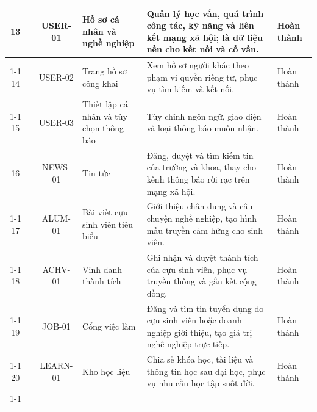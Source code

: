 \documentclass[12pt,a4paper,oneside]{report}
\begin{document}
\begin{landscape}
\begin{longtable}{|c|>{\raggedright\arraybackslash}p{3.1cm}|c|>{\raggedright\arraybackslash}p{4.6cm}|>{\raggedright\arraybackslash}p{8.4cm}|>{\raggedright\arraybackslash}p{2.4cm}|}
\hline
\cellcolor{oldrow}13 & \cellcolor{oldrow} & \cellcolor{oldrow}USER-01 & \cellcolor{oldrow}Hồ sơ cá nhân và nghề nghiệp & \cellcolor{oldrow}Quản lý học vấn, quá trình công tác, kỹ năng và liên kết mạng xã hội; là dữ liệu nền cho kết nối và cố vấn. & \cellcolor{oldrow}Hoàn thành \\
\cline{1-1}\cline{3-6}
\cellcolor{oldrow}14 & \cellcolor{oldrow} & \cellcolor{oldrow}USER-02 & \cellcolor{oldrow}Trang hồ sơ công khai & \cellcolor{oldrow}Xem hồ sơ người khác theo phạm vi quyền riêng tư, phục vụ tìm kiếm và kết nối. & \cellcolor{oldrow}Hoàn thành \\
\cline{1-1}\cline{3-6}
\cellcolor{oldrow}15 & \multirow{-3}{2.4cm}{\cellcolor{oldrow}\textbf{Hồ sơ người dùng}} & \cellcolor{oldrow}USER-03 & \cellcolor{oldrow}Thiết lập cá nhân và tùy chọn thông báo & \cellcolor{oldrow}Tùy chỉnh ngôn ngữ, giao diện và loại thông báo muốn nhận. & \cellcolor{oldrow}Hoàn thành \\
\hline
\cellcolor{oldrow}16 & \cellcolor{oldrow} & \cellcolor{oldrow}NEWS-01 & \cellcolor{oldrow}Tin tức & \cellcolor{oldrow}Đăng, duyệt và tìm kiếm tin của trường và khoa, thay cho kênh thông báo rời rạc trên mạng xã hội. & \cellcolor{oldrow}Hoàn thành \\
\cline{1-1}\cline{3-6}
\cellcolor{oldrow}17 & \cellcolor{oldrow} & \cellcolor{oldrow}ALUM-01 & \cellcolor{oldrow}Bài viết cựu sinh viên tiêu biểu & \cellcolor{oldrow}Giới thiệu chân dung và câu chuyện nghề nghiệp, tạo hình mẫu truyền cảm hứng cho sinh viên. & \cellcolor{oldrow}Hoàn thành \\
\cline{1-1}\cline{3-6}
\cellcolor{oldrow}18 & \cellcolor{oldrow} & \cellcolor{oldrow}ACHV-01 & \cellcolor{oldrow}Vinh danh thành tích & \cellcolor{oldrow}Ghi nhận và duyệt thành tích của cựu sinh viên, phục vụ truyền thông và gắn kết cộng đồng. & \cellcolor{oldrow}Hoàn thành \\
\cline{1-1}\cline{3-6}
\cellcolor{oldrow}19 & \cellcolor{oldrow} & \cellcolor{oldrow}JOB-01 & \cellcolor{oldrow}Cổng việc làm & \cellcolor{oldrow}Đăng và tìm tin tuyển dụng do cựu sinh viên hoặc doanh nghiệp giới thiệu, tạo giá trị nghề nghiệp trực tiếp. & \cellcolor{oldrow}Hoàn thành \\
\cline{1-1}\cline{3-6}
\cellcolor{oldrow}20 & \cellcolor{oldrow} & \cellcolor{oldrow}LEARN-01 & \cellcolor{oldrow}Kho học liệu & \cellcolor{oldrow}Chia sẻ khóa học, tài liệu và thông tin học sau đại học, phục vụ nhu cầu học tập suốt đời. & \cellcolor{oldrow}Hoàn thành \\
\cline{1-1}\cline{3-6}

\end{longtable}
\end{landscape}
\end{document}
